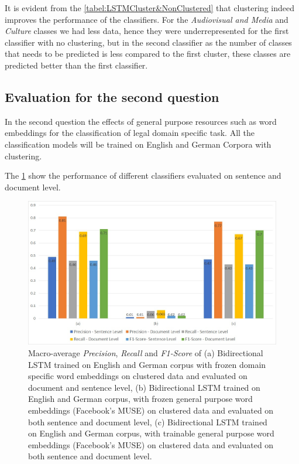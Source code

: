 It is evident from the \ref{tabel:LSTMCluster&NonClustered} that clustering indeed improves the performance of the classifiers. For the \textit{Audiovisual and Media} and \textit{Culture} classes we had less data, hence they were underrepresented for the first classifier with no clustering, but in the second classifier as the number of classes that needs to be predicted is less compared to the first cluster, these classes are predicted better than the first classifier.


\clearpage


\subsection{Evaluation for the second question}

In the second question the effects of general purpose resources such as word embeddings for the classification of legal domain specific task. All the classification models will be trained on English and German Corpora with clustering. 

The \ref{fig:SecondEvalQuestion} show the performance of different classifiers evaluated on sentence and document level.

\begin{figure}[!ht]
    \centering
    \includegraphics[width=15cm, keepaspectratio]{pics/FBMUSEQ2.jpg}
    \caption{Macro-average \textit{Precision}, \textit{Recall} and \textit{F1-Score} of (a) Bidirectional LSTM trained on English and German corpus with frozen domain specific word embeddings on clustered data and evaluated on document and sentence level, (b)  Bidirectional LSTM trained on English and German corpus, with frozen general purpose word embeddings (Facebook's MUSE) on clustered data and evaluated on both sentence and document level, (c) Bidirectional LSTM trained on English and German corpus, with trainable general purpose word embeddings (Facebook's MUSE) on clustered data and evaluated on both sentence and document level.}
    \label{fig:SecondEvalQuestion}
\end{figure}

